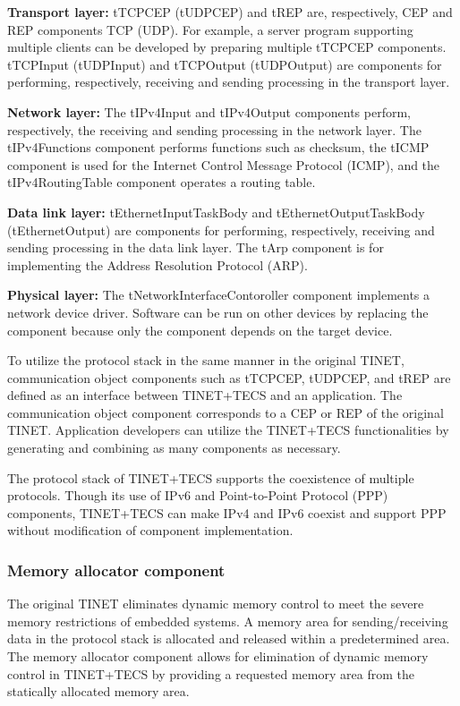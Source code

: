 \documentclass[JIP]{ipsj_v2/UTF8/ipsj}
\begin{document}
{\bf Transport layer:}
tTCPCEP (tUDPCEP) and tREP are, respectively, CEP and REP components TCP (UDP).
For example, a server program supporting multiple clients can be developed by preparing multiple tTCPCEP components.
tTCPInput (tUDPInput) and tTCPOutput (tUDPOutput) are components for performing, respectively, receiving and sending processing in the transport layer.

{\bf Network layer:}
The tIPv4Input and tIPv4Output components perform, respectively, the receiving and sending processing in the network layer.
The tIPv4Functions component performs functions such as checksum, the tICMP component is used for the Internet Control Message Protocol (ICMP), and the tIPv4RoutingTable component operates a routing table.

{\bf Data link layer:}
tEthernetInputTaskBody and tEthernetOutputTaskBody (tEthernetOutput) are components for performing, respectively, receiving and sending processing in the data link layer.
The tArp component is for implementing the Address Resolution Protocol (ARP).

{\bf Physical layer:}
The tNetworkInterfaceContoroller component implements a network device driver.
Software can be run on other devices by replacing the component because only the component depends on the target device.

To utilize the protocol stack in the same manner in the original TINET, communication object components such as tTCPCEP, tUDPCEP, and tREP are defined as an interface between TINET+TECS and an application.
The communication object component corresponds to a CEP or REP of the original TINET.
Application developers can utilize the TINET+TECS functionalities by generating and combining as many components as necessary.

The protocol stack of TINET+TECS supports the coexistence of multiple protocols.
Though its use of IPv6 and Point-to-Point Protocol (PPP) components, TINET+TECS can make IPv4 and IPv6 coexist and support PPP without modification of component implementation.

\subsubsection*{Memory allocator component} 

The original TINET eliminates dynamic memory control to meet the severe memory restrictions of embedded systems.
A memory area for sending/receiving data in the protocol stack is allocated and released within a predetermined area.
The memory allocator component allows for elimination of dynamic memory control in TINET+TECS by providing a requested memory area from the statically allocated memory area.
\end{document}
